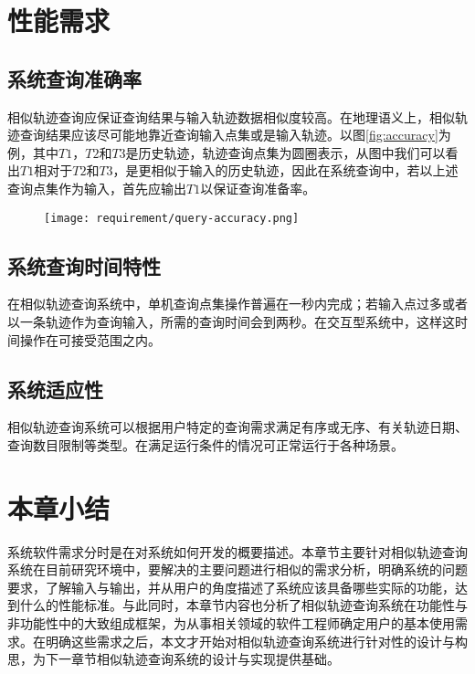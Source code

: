
\vspace{3mm}

\begin{figure}[!htp]
    \centering
    \resizebox{!}{!}{}
\end{figure}

\section{性能需求}
\label{sec:performance requirements}

\subsection{系统查询准确率}
\label{subsec:performance accuracy}
相似轨迹查询应保证查询结果与输入轨迹数据相似度较高。在地理语义上，相似轨迹查询结果应该尽可能地靠近查询输入点集或是输入轨迹。以图\ref{fig:accuracy}\cite{hongzhi2017parallel}为例，其中$T1$，$T2$和$T3$是历史轨迹，轨迹查询点集为圆圈表示，从图中我们可以看出$T1$相对于$T2$和$T3$，是更相似于输入的历史轨迹，因此在系统查询中，若以上述查询点集作为输入，首先应输出$T1$以保证查询准备率。

\begin{figure}[!htp]
  \centering
  \texttt{[image: requirement/query-accuracy.png]}
\end{figure}

\subsection{系统查询时间特性}
\label{subsec:performance time}
在相似轨迹查询系统中，单机查询点集操作普遍在一秒内完成；若输入点过多或者以一条轨迹作为查询输入，所需的查询时间会到两秒。在交互型系统中，这样这时间操作在可接受范围之内。

\subsection{系统适应性}
\label{subsec:performance flexibility}
相似轨迹查询系统可以根据用户特定的查询需求满足有序或无序、有关轨迹日期、查询数目限制等类型。在满足运行条件的情况可正常运行于各种场景。

\section{本章小结}
\label{sec:requirement conclusion}
系统软件需求分时是在对系统如何开发的概要描述。本章节主要针对相似轨迹查询系统在目前研究环境中，要解决的主要问题进行相似的需求分析，明确系统的问题要求，了解输入与输出，并从用户的角度描述了系统应该具备哪些实际的功能，达到什么的性能标准。与此同时，本章节内容也分析了相似轨迹查询系统在功能性与非功能性中的大致组成框架，为从事相关领域的软件工程师确定用户的基本使用需求。在明确这些需求之后，本文才开始对相似轨迹查询系统进行针对性的设计与构思，为下一章节相似轨迹查询系统的设计与实现提供基础。
